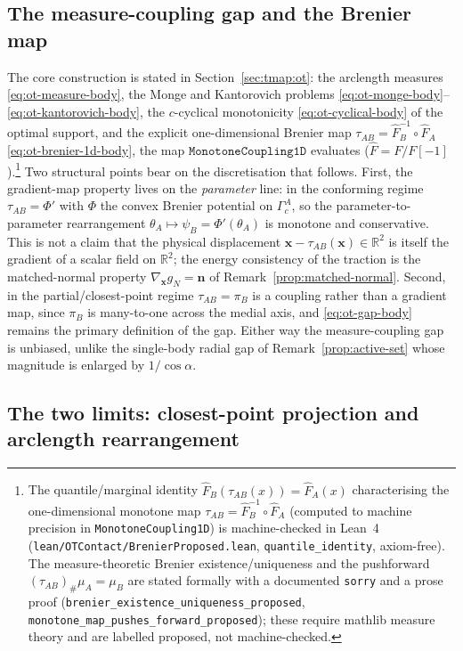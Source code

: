 \documentclass{svjour3}                 %
\newcommand{\R}{\mathbb{R}}
\newcommand{\nbf}{\bm{n}}
\newcommand{\xbf}{\bm{x}}
\newcommand{\gn}{g_{\scriptscriptstyle N}}
\newcommand{\tmap}{\tau_{AB}}
\newcommand{\grad}{\nabla}
\newcommand{\code}[1]{\texttt{#1}}
\begin{document}
\subsection{The measure-coupling gap and the Brenier map}\label{app:ot:gap}

The core construction is stated in Section~\ref{sec:tmap:ot}: the arclength measures \eqref{eq:ot-measure-body},
the Monge and Kantorovich problems \eqref{eq:ot-monge-body}--\eqref{eq:ot-kantorovich-body}, the $c$-cyclical
monotonicity \eqref{eq:ot-cyclical-body} of the optimal support, and the explicit one-dimensional Brenier map
$\tmap=\hat F_B^{-1}\circ\hat F_A$ \eqref{eq:ot-brenier-1d-body}, the map $\code{MonotoneCoupling1D}$ evaluates
($\hat F=F/F[-1]$).\footnote{The quantile/marginal identity
$\hat F_B(\tmap(x))=\hat F_A(x)$ characterising the one-dimensional monotone map $\tmap=\hat F_B^{-1}\!\circ\hat F_A$ (computed to
machine precision in \code{MonotoneCoupling1D}) is machine-checked in Lean~4
(\code{lean/OTContact/BrenierProposed.lean}, \code{quantile\_identity}, axiom-free). The measure-theoretic Brenier
existence/uniqueness and the pushforward $(\tmap)_\#\mu_A=\mu_B$ are stated formally with a documented \code{sorry}
and a prose proof (\code{brenier\_existence\_uniqueness\_proposed}, \code{monotone\_map\_pushes\_forward\_proposed});
these require mathlib measure theory and are labelled proposed, not machine-checked.} Two structural points bear on
the discretisation that follows. First, the gradient-map
property lives on the \emph{parameter} line: in the conforming regime $\tmap=\Phi'$ with $\Phi$ the convex Brenier
potential on $\Gamma_c^A$, so the parameter-to-parameter rearrangement $\theta_A\mapsto\psi_B=\Phi'(\theta_A)$ is
monotone and conservative. This is not a claim that the physical displacement $\xbf-\tmap(\xbf)\in\R^2$ is itself
the gradient of a scalar field on $\R^2$; the energy consistency of the traction is the matched-normal property
$\grad_{\xbf}\gn=\nbf$ of Remark~\ref{prop:matched-normal}. Second, in the partial/closest-point regime
$\tmap=\pi_B$ is a coupling rather than a gradient map, since $\pi_B$ is many-to-one across the medial axis, and
\eqref{eq:ot-gap-body} remains the primary definition of the gap. Either way the measure-coupling gap is unbiased,
unlike the single-body radial gap of Remark~\ref{prop:active-set} whose magnitude is enlarged by $1/\cos\alpha$.

\subsection{The two limits: closest-point projection and arclength rearrangement}\label{app:ot:limits}
\end{document}
